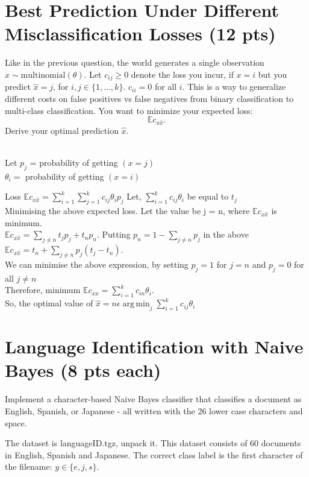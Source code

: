 \documentclass[a4paper]{article}
\theoremstyle{definition}
\DeclareMathOperator*{\argmin}{arg\,min}
\def\E{\mathbb E}
\newenvironment{soln}{
    \leavevmode\color{blue}\ignorespaces
}{}
\begin{document}
\section{Best Prediction Under Different Misclassification Losses (12 pts)}
Like in the previous question, 
the world generates a single observation $x \sim \mbox{multinomial}(\theta)$.
Let $c_{ij} \ge 0$ denote the loss you incur, if $x=i$ but you predict $\hat x=j$, for $i,j \in \{1, \ldots, k\}$.
$c_{ii}=0$ for all $i$.
This is a way to generalize different costs on false positives vs false negatives from binary classification to multi-class classification.
You want to minimize your expected loss:
$$\E c_{x \hat x}.$$
Derive your optimal prediction $\hat x$.

\begin{soln}
\\Let $p_j$ = probability of getting $(x=j)$
\\$\theta_i = $ probability of getting $(x=i)$ 

Loss $\E c_{x \hat x} = \sum_{i=1}^{k}\sum_{j=1}^{k}c_{ij}\theta_ip_j $
Let, $\sum_{i=1}^{k}c_{ij}\theta_i$ be equal to $t_j$\\

Minimising the above expected loss. Let the value be j = n, where $\E c_{x \hat x}$ is minimum.
\\$\E c_{x \hat x} = \sum_{j \neq n}^{}t_jp_j + t_np_n$. Putting $p_n = 1 - \sum_{j \neq n}p_j$ in the above\\
$\E c_{x \hat x} = t_n + \sum_{j \neq n}p_j(t_j-t_n)$.\\
We can minimise the above expression, by setting  $p_j = 1$ for $j = n$ and $p_j = 0$ for all $j \neq n$\\
Therefore, minimum $\E c_{x \hat x} = \sum_{i=1}^{k}c_{in}\theta_i$.\\
So, the optimal value of $\hat x = n \epsilon \argmin_j \sum_{i=1}^{k}c_{ij}\theta_i$

\end{soln}


\section{Language Identification with Naive Bayes (8 pts each)}
Implement a character-based Naive Bayes classifier that classifies a document as English, Spanish, or Japanese - all written with the 26 lower case characters and space.

The dataset is languageID.tgz, unpack it.
This dataset consists of 60 documents in English, Spanish and Japanese. 
The correct class label is the first character of the filename: $y \in \{e, j, s\}$.
\end{document}
